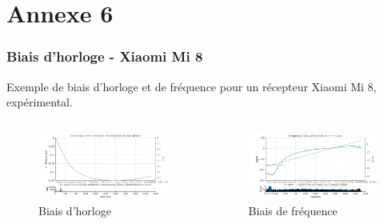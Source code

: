 \documentclass[xcolor=dvipsnames,envcountsect]{beamer}
\begin{document}
\section{Annexe 6}
\begin{frame}
	\label{appendix:6}
	\frametitle{Biais d'horloge - Xiaomi Mi 8}
	Exemple de biais d'horloge et de fréquence pour un récepteur Xiaomi Mi 8, expérimental.
	\newline
	\begin{columns}
		\begin{column}{0.5\textwidth}
			\begin{figure}
				\centering
				\includegraphics[width=1\textwidth]{./Figures/Clock bias.png}
				\caption {Biais d'horloge}
			\end{figure}
		\end{column}

		\begin{column}{0.5\textwidth}
			\begin{figure}
				\centering
				\includegraphics[width=1\textwidth]{./Figures/Clock bias_freq.png}
				\caption {Biais de fréquence}
			\end{figure}
		\end{column}
	\end{columns}
\end{frame}
\end{document}
